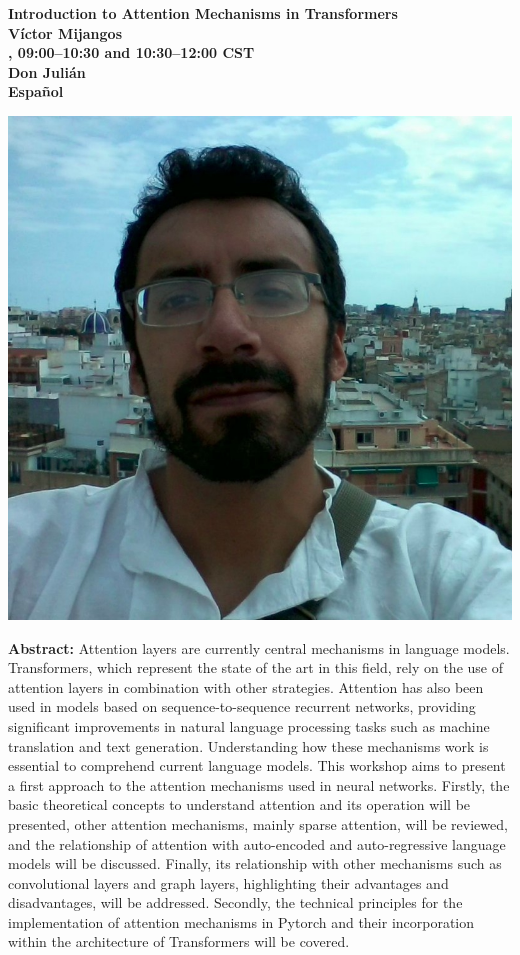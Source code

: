 \clearpage
\begin{center}
{\bfseries\Large Introduction to Attention Mechanisms in Transformers} \\
\vspace{1.0em}
{\large\bf V\'ictor Mijangos} \\

\textbf{\daydateyear{}, 09:00--10:30 and 10:30--12:00 CST}\\
\textbf{Don Juli\'an}\\
\textbf{Espa\~nol}
\end{center}

\begin{center}
\includegraphics[width=0.4\linewidth]{content/mexican_nlp/victor.jpeg}
\end{center}

{\bfseries Abstract:}
Attention layers are currently central mechanisms in language models. Transformers, which represent the state of the art in this field, rely on the use of attention layers in combination with other strategies. Attention has also been used in models based on sequence-to-sequence recurrent networks, providing significant improvements in natural language processing tasks such as machine translation and text generation. Understanding how these mechanisms work is essential to comprehend current language models. This workshop aims to present a first approach to the attention mechanisms used in neural networks. Firstly, the basic theoretical concepts to understand attention and its operation will be presented, other attention mechanisms, mainly sparse attention, will be reviewed, and the relationship of attention with auto-encoded and auto-regressive language models will be discussed. Finally, its relationship with other mechanisms such as convolutional layers and graph layers, highlighting their advantages and disadvantages, will be addressed. Secondly, the technical principles for the implementation of attention mechanisms in Pytorch and their incorporation within the architecture of Transformers will be covered.

